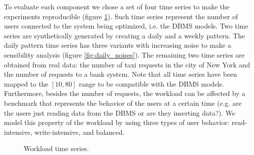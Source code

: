 \documentclass[a4paper, 12pt]{article} %
\begin{document}
	To evaluate each component we chose a set of four time series to make the experiments reproducible (figure \ref{fig:time_series}). Such time series represent the number of users connected to the system being optimized, i.e. the DBMS models.  Two time series are synthetically generated by creating a daily and a weekly pattern. The daily pattern time series has three variants with increasing noise to make a sensibility analysis (figure \ref{fig:daily_noises}). The remaining two time series are obtained from real data: the number of taxi requests in the city of New York and the number of requests to a bank system. Note that all time series have been mapped to the $[10, 80]$ range to be compatible with the DBMS models. \\
	Furthermore, besides the number of requests, the workload can be affected by a benchmark that represents the behavior of the users at a certain time (e.g. are the users just reading data from the DBMS or are they inserting data?). We model this property of the workload by using three types of user behavior: read-intensive, write-intensive, and balanced.
	\begin{figure}\centering
		 \hfill
		
		\caption{Workload time series.}
		\label{fig:time_series}
	\end{figure}
	
\end{document}
